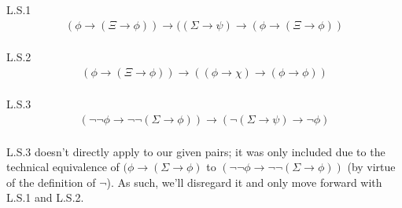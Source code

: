 \documentclass{article}
\begin{document}
L.S.1
\begin{gather*}
	(\phi \rightarrow (\Xi \rightarrow \phi)) \rightarrow ((\Sigma \rightarrow \psi) \rightarrow (\phi \rightarrow (\Xi \rightarrow \phi))
\end{gather*} \\

L.S.2
\begin{gather*}
	(\phi \rightarrow (\Xi \rightarrow \phi)) \rightarrow ((\phi \rightarrow \chi) \rightarrow (\phi \rightarrow \phi))
\end{gather*} \\

L.S.3
\begin{gather*}
(\neg\neg \phi \rightarrow \neg\neg(\Sigma \rightarrow \phi)) \rightarrow (\neg(\Sigma \rightarrow \psi) \rightarrow \neg\phi)
\end{gather*} \\

L.S.3 doesn't directly apply to our given pairs; it was only included due to the technical equivalence of $(\phi \rightarrow (\Sigma \rightarrow \phi)$ to $(\neg \neg \phi \rightarrow \neg\neg(\Sigma \rightarrow \phi))$ (by virtue of the definition of $\neg$). As such, we'll disregard it and only move forward with L.S.1 and L.S.2. \\
\end{document}
